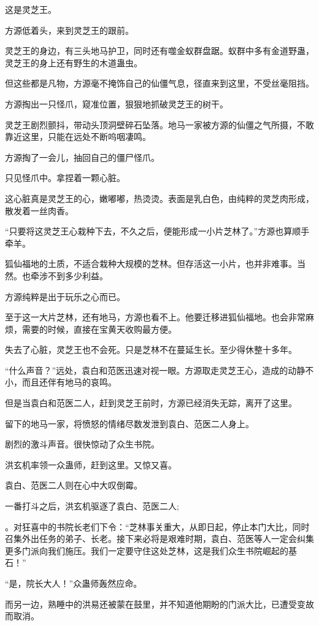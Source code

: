 \begin{this_body}
这是灵芝王。

方源低着头，来到灵芝王的跟前。

灵芝王的身边，有三头地马护卫，同时还有噬金蚁群盘踞。蚁群中多有金道野蛊，灵芝王的身上还有野生的木道蛊虫。

但这些都是凡物，方源毫不掩饰自己的仙僵气息，径直来到这里，不受丝毫阻挡。

方源掏出一只怪爪，窥准位置，狠狠地抓破灵芝王的树干。

灵芝王剧烈颤抖，带动头顶洞壁碎石坠落。地马一家被方源的仙僵之气所摄，不敢靠近这里，只能在远处不断呜咽凄鸣。

方源掏了一会儿，抽回自己的僵尸怪爪。

只见怪爪中。拿捏着一颗心脏。

这心脏真是灵芝王的心，嫩嘟嘟，热烫烫。表面是乳白色，由纯粹的灵芝肉形成，散发着一丝肉香。

“只要将这灵芝王心栽种下去，不久之后，便能形成一小片芝林了。”方源也算顺手牵羊。

狐仙福地的土质，不适合栽种大规模的芝林。但存活这一小片，也并非难事。当然。也牵涉不到多少利益。

方源纯粹是出于玩乐之心而已。

至于这一大片芝林，还有地马，方源也看不上。他要迁移进狐仙福地。也会非常麻烦，需要的时候，直接在宝黄天收购最方便。

失去了心脏，灵芝王也不会死。只是芝林不在蔓延生长。至少得休整十多年。

“什么声音？”远处，袁白和范医迅速对视一眼。方源取走灵芝王心，造成的动静不小，而且还伴有地马的哀鸣。

但是当袁白和范医二人，赶到灵芝王前时，方源已经消失无踪，离开了这里。

留下的地马一家，将愤怒的情绪尽数发泄到袁白、范医二人身上。

剧烈的激斗声音。很快惊动了众生书院。

洪玄机率领一众蛊师，赶到这里。又惊又喜。

袁白、范医二人则在心中大叹倒霉。

一番打斗之后，洪玄机驱逐了袁白、范医二人;

。对狂喜中的书院长老们下令：“芝林事关重大，从即日起，停止本门大比，同时召集外出任务的弟子、长老。接下来必将是艰难时期，袁白、范医等人一定会纠集更多门派向我们施压。我们一定要守住这处芝林，这是我们众生书院崛起的基石！”

“是，院长大人！”众蛊师轰然应命。

而另一边，熟睡中的洪易还被蒙在鼓里，并不知道他期盼的门派大比，已遭受变故而取消。


\end{this_body}
